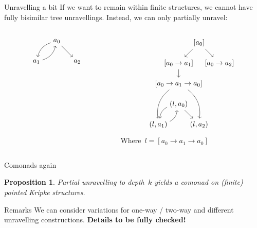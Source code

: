 \documentclass{beamer}
\newtheorem{proposition}{Proposition}
\begin{document}
\begin{frame}{Unravelling a bit}
If we want to remain within finite structures, we cannot have fully bisimilar tree unravellings. Instead, we can only partially unravel:
\begin{columns}
\begin{column}{0.5\textwidth}
\begin{equation*}
        \begin{tikzpicture}
        \path node(a0) {$a_0$} +(-1,-1) node (a1) {$a_1$} +(1,-1) node(a2) {$a_2$};
        \path[->] 
        (a0) edge[bend right] (a1)
        (a1) edge[bend right] (a0)
        (a0) edge (a2);
        \end{tikzpicture}
    \end{equation*}
\end{column}
\begin{column}{0.5\textwidth}
\begin{equation*}
        \begin{tikzpicture}
        \path 
        node (a) {$[a_0]$} +(-1,-1) 
        node (b) {$[a_0 \rightarrow a_1]$} ++(1,-1)
        node (c) {$[a_0 \rightarrow a_2]$} (b) ++(0,-1)
        node (a') {$[a_0 \rightarrow a_1 \rightarrow a_0]$} ++(0,-1)
        node (a'') {$(l, a_0)$} +(-1,-1)
        node (b'') {$(l, a_1)$} +(1,-1)
        node (c'') {$(l, a_2)$};
        \path[->]
        (a) edge (b)
        (a) edge (c)
        (b) edge (a')
        (a') edge[bend right] (b'')
        (a') edge[bend left] (c'')
        (a'') edge[bend right] (b'')
        (b'') edge[bend right] (a'')
        (a'') edge (c'');
        \end{tikzpicture}
    \end{equation*}
    Where~$l = [a_0 \rightarrow a_1 \rightarrow a_0]$
\end{column}
\end{columns}    
    
\end{frame}

\begin{frame}{Comonads again}
    \begin{proposition}
    Partial unravelling to depth~$k$ yields a comonad on (finite) pointed Kripke structures.
    \end{proposition}
    \begin{block}{Remarks}
    We can consider variations for one-way / two-way and different unravelling constructions. {\bf Details to be fully checked!}
    \end{block}
\end{frame}
\end{document}
